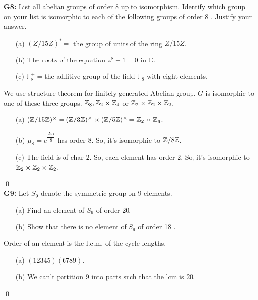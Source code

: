 \textbf{G8:} List all abelian groups of order 8 up to isomorphism. Identify which group on your list is isomorphic to each of the following groups of order 8 . Justify your answer.
\begin{itemize}
	\item[(a)] $(Z / 15 Z)^*=$ the group of units of the ring $Z / 15 Z$.
	\item[(b)] The roots of the equation $z^8-1=0 \text{ in } \mathbb{C}$.
	\item[(c)] $\mathbb{F}_8^{+}=$the additive group of the field $\mathbb{F}_8$ with eight elements.
\end{itemize}
\soln We use structure theorem for finitely generated Abelian group. $ G $ is isomorphic to one of these three groups. $ \mathbb{Z}_8, \mathbb{Z}_2\times\mathbb{Z}_4 $ or $ \mathbb{Z}_2\times \mathbb{Z}_2\times \mathbb{Z}_2 $.\\
\begin{itemize}
	\item[(a)]  $ (\mathbb{Z}/ 15\mathbb{Z})^\times = (\mathbb{Z}/3\mathbb{Z})^\times \times (\mathbb{Z}/5\mathbb{Z})^\times = \mathbb{Z}_2\times\mathbb{Z}_4 $.
	\item[(b)] $ \mu_8 = e^{\dfrac{2\pi i}{8}} $ has order 8. So, it's isomorphic to $ \mathbb{Z}/8\mathbb{Z} $.
	\item[(c)] The field is of char $ 2 $. So, each element has order $ 2 $. So, it's isomorphic to $ \mathbb{Z}_2\times \mathbb{Z}_2\times \mathbb{Z}_2 $.
\end{itemize}
\qed\\
\textbf{G9:} Let $S_9$ denote the symmetric group on 9 elements.
\begin{itemize}
	\item[(a)] Find an element of $S_9$ of order 20.
	\item[(b)] Show that there is no element of $S_9$ of order 18 .
\end{itemize}
\soln Order of an element is the l.c.m. of the cycle lengths. 
\begin{itemize}
	\item[(a)] $ (12345)(6789) $.
	\item[(b)] We can't partition 9 into parts such that the lcm is $ 20 $.
\end{itemize}
\qed\\

